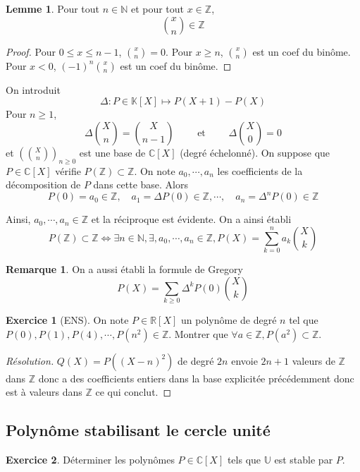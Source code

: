 \documentclass{article}
\theoremstyle{definition}
\newtheorem*{lmm}{Lemme}
\newtheorem*{rem}{Remarque}
\newtheorem*{exo}{Exercice}
\begin{document}
\begin{lmm}
    Pour tout $n\in\mathbb N$ et pour tout $x\in\mathbb Z$, \[
        \binom xn\in\mathbb Z
    \]
\end{lmm}

\begin{proof}
    Pour $0\leq x\leq n-1$, $\binom xn=0$. Pour $x\geq n$, $\binom xn$ est un coef du binôme. Pour $x<0$, $(-1)^n\binom xn$ est un coef du binôme.
\end{proof}

 On introduit \[
    \Delta : P\in\mathbb K[X]\longmapsto P(X+1)-P(X)
\]
Pour $n\geq 1$, \[
    \Delta\binom Xn=\binom X{n-1}\qquad\text{ et }\qquad \Delta\binom X0=0
\]
et $\displaystyle \left(\binom Xn\right)_{n\geq 0}$ est une base de $\mathbb C[X]$ (degré échelonné). On suppose que $P\in\mathbb C[X]$ vérifie $P(\mathbb Z)\subset \mathbb Z$. On note $a_0, \cdots, a_n$ les coefficients de la décomposition de $P$ dans cette base. Alors \[
    P(0)=a_0\in\mathbb Z, \quad a_1=\Delta P(0)\in\mathbb Z, \cdots, \quad a_n=\Delta^nP(0)\in\mathbb Z
\]

Ainsi, $a_0, \cdots, a_n\in\mathbb Z$ et la réciproque est évidente. On a ainsi établi \[
    P(\mathbb Z)\subset \mathbb Z\iff \exists n\in\mathbb N, \exists, a_0, \cdots, a_n\in\mathbb Z, P(X)=\sum_{k=0}^na_k\binom Xk
\]

\begin{rem}
    On a aussi établi la formule de Gregory \[
        P(X)=\sum_{k\geq 0}\Delta^kP(0)\binom Xk
    \]
\end{rem}

\begin{exo}[ENS]
    On note $P\in\mathbb R[X]$ un polynôme de degré $n$ tel que $P(0), P(1), P(4), \cdots, P(n^2)\in\mathbb Z$. Montrer que $\forall a\in\mathbb Z, P(a^2)\subset \mathbb Z$.
\end{exo}

\begin{proof}[Résolution]
    $Q(X)=P((X-n)^2)$ de degré $2n$ envoie $2n+1$ valeurs de $\mathbb Z$ dans $\mathbb Z$ donc a des coefficients entiers dans la base explicitée précédemment donc est à valeurs dans $\mathbb Z$ ce qui conclut.
\end{proof}

\subsection{Polynôme stabilisant le cercle unité}

\begin{exo}
    Déterminer les polynômes $P\in\mathbb C[X]$ tels que $\mathbb U$ est stable par $P$.
\end{exo}
\end{document}
